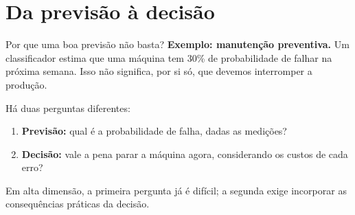\documentclass[
  10pt,
  ignorenonframetext,
  aspectratio=169,
  brazilian,
]{beamer}
\providecommand{\tightlist}{%
  \setlength{\itemsep}{0pt}\setlength{\parskip}{0pt}}
\begin{document}
\section{Da previsão à decisão}\label{da-previsuxe3o-uxe0-decisuxe3o}

\begin{frame}{Por que uma boa previsão não basta?}
\protect{}\label{por-que-uma-boa-previsuxe3o-nuxe3o-basta}
\textbf{Exemplo: manutenção preventiva.} Um classificador estima que uma
máquina tem 30\% de probabilidade de falhar na próxima semana. Isso não
significa, por si só, que devemos interromper a produção.

Há duas perguntas diferentes:

\begin{enumerate}
\tightlist
\item
  \textbf{Previsão:} qual é a probabilidade de falha, dadas as medições?
\item
  \textbf{Decisão:} vale a pena parar a máquina agora, considerando os
  custos de cada erro?
\end{enumerate}

Em alta dimensão, a primeira pergunta já é difícil; a segunda exige
incorporar as consequências práticas da decisão.
\end{frame}
\end{document}
